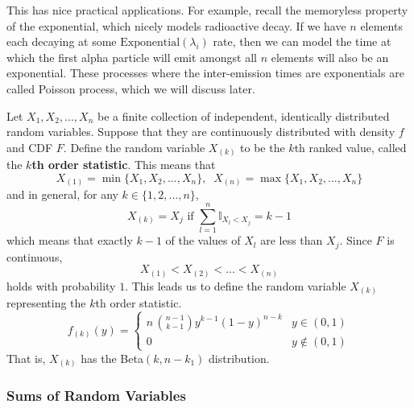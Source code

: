 \documentclass{article}
\begin{document}
      This has nice practical applications. For example, recall the memoryless property of the exponential, which nicely models radioactive decay. If we have $n$ elements each decaying at some $\mathrm{Exponential}(\lambda_i)$ rate, then we can model the time at which the first alpha particle will emit amongst all $n$ elements will also be an exponential. These processes where the inter-emission times are exponentials are called Poisson process, which we will discuss later. 

      \begin{definition}
        Let $X_1, X_2, ..., X_n$ be a finite collection of independent, identically distributed random variables. Suppose that they are continuously distributed with density $f$ and CDF $F$. Define the random variable $X_{(k)}$ to be the $k$th ranked value, called the \textbf{$k$th order statistic}. This means that 
        \begin{equation}
          X_{(1)} = \min\{X_1, X_2, ..., X_n\}, \;\; X_{(n)} = \max\{X_1, X_2, ..., X_n\}
        \end{equation}
        and in general, for any $k \in \{1, 2, ..., n\}$, 
        \begin{equation}
          X_{(k)} = X_j \text{ if } \sum_{l=1}^n \mathbb{I}_{X_l < X_j} = k - 1
        \end{equation}
        which means that exactly $k-1$ of the values of $X_l$ are less than $X_j$. Since $F$ is continuous, 
        \begin{equation}
          X_{(1)} < X_{(2)} < ... < X_{(n)}
        \end{equation}
        holds with probability $1$. This leads us to define the random variable $X_{(k)}$ representing the $k$th order statistic.
        \begin{equation}
          f_{(k)} (y) = \begin{cases} 
          n \, \binom{n-1}{k-1} y^{k-1} (1-y)^{n-k} & y \in (0, 1) \\
          0 & y \not\in (0,1)
          \end{cases}
        \end{equation}
        That is, $X_{(k)}$ has the Beta$(k, n-k_1)$ distribution. 
      \end{definition}

    \subsubsection{Sums of Random Variables}
\end{document}
